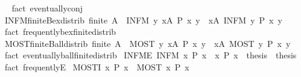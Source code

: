 \begin{isabellebody}
\isadelimproof
\ %
\endisadelimproof
%
\isatagproof
{}\isamarkupfalse%
\ {\isacharparenleft}fact\ eventually{\isacharunderscore}conj{\isacharparenright}%
\endisatagproof
{\isafoldproof}%
%
\isadelimproof
%
\endisadelimproof
\isanewline
{}\isamarkupfalse%
\ INFM{\isacharunderscore}finite{\isacharunderscore}Bex{\isacharunderscore}distrib{\isacharcolon}\ {\isachardoublequoteopen}finite\ A\ {\isasymLongrightarrow}\ {\isacharparenleft}INFM\ y{\isachardot}\ {\isasymexists}x{\isasymin}A{\isachardot}\ P\ x\ y{\isacharparenright}\ {\isasymlongleftrightarrow}\ {\isacharparenleft}{\isasymexists}x{\isasymin}A{\isachardot}\ INFM\ y{\isachardot}\ P\ x\ y{\isacharparenright}{\isachardoublequoteclose}%
\isadelimproof
\ %
\endisadelimproof
%
\isatagproof
{}\isamarkupfalse%
\ {\isacharparenleft}fact\ frequently{\isacharunderscore}bex{\isacharunderscore}finite{\isacharunderscore}distrib{\isacharparenright}%
\endisatagproof
{\isafoldproof}%
%
\isadelimproof
%
\endisadelimproof
\isanewline
{}\isamarkupfalse%
\ MOST{\isacharunderscore}finite{\isacharunderscore}Ball{\isacharunderscore}distrib{\isacharcolon}\ {\isachardoublequoteopen}finite\ A\ {\isasymLongrightarrow}\ {\isacharparenleft}MOST\ y{\isachardot}\ {\isasymforall}x{\isasymin}A{\isachardot}\ P\ x\ y{\isacharparenright}\ {\isasymlongleftrightarrow}\ {\isacharparenleft}{\isasymforall}x{\isasymin}A{\isachardot}\ MOST\ y{\isachardot}\ P\ x\ y{\isacharparenright}{\isachardoublequoteclose}%
\isadelimproof
\ %
\endisadelimproof
%
\isatagproof
{}\isamarkupfalse%
\ {\isacharparenleft}fact\ eventually{\isacharunderscore}ball{\isacharunderscore}finite{\isacharunderscore}distrib{\isacharparenright}%
\endisatagproof
{\isafoldproof}%
%
\isadelimproof
%
\endisadelimproof
\isanewline
{}\isamarkupfalse%
\ INFM{\isacharunderscore}E{\isacharcolon}\ {\isachardoublequoteopen}INFM\ x{\isachardot}\ P\ x\ {\isasymLongrightarrow}\ {\isacharparenleft}{\isasymAnd}x{\isachardot}\ P\ x\ {\isasymLongrightarrow}\ thesis{\isacharparenright}\ {\isasymLongrightarrow}\ thesis{\isachardoublequoteclose}%
\isadelimproof
\ %
\endisadelimproof
%
\isatagproof
{}\isamarkupfalse%
\ {\isacharparenleft}fact\ frequentlyE{\isacharparenright}%
\endisatagproof
{\isafoldproof}%
%
\isadelimproof
%
\endisadelimproof
\isanewline
{}\isamarkupfalse%
\ MOST{\isacharunderscore}I{\isacharcolon}\ {\isachardoublequoteopen}{\isacharparenleft}{\isasymAnd}x{\isachardot}\ P\ x{\isacharparenright}\ {\isasymLongrightarrow}\ MOST\ x{\isachardot}\ P\ x{\isachardoublequoteclose}%

\end{isabellebody}
